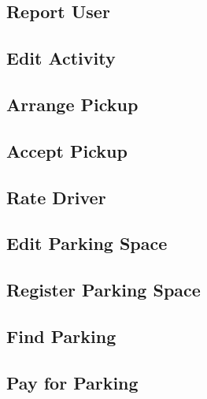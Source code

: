 \documentclass[11pt]{article}
\begin{document}
\subsection{Report User}

\subsection{Edit Activity}

\subsection{Arrange Pickup}
\subsection{Accept Pickup}
\subsection{Rate Driver}

\subsection{Edit Parking Space}
\subsection{Register Parking Space}
\subsection{Find Parking}


\subsection{Pay for Parking}
\end{document}
